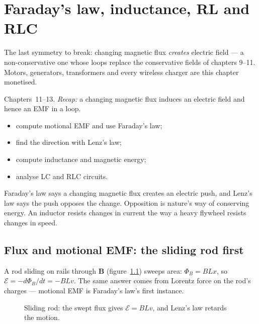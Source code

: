 \chapter{Faraday's law, inductance, RL and RLC}\label{ch:faraday}

The last symmetry to break: changing magnetic flux \emph{creates}
electric field --- a non-conservative one whose loops replace the
conservative fields of chapters 9--11. Motors, generators, transformers
and every wireless charger are this chapter monetised.

\begin{rulebox}
Chapters~11--13. \emph{Recap:} a changing magnetic flux induces an electric field and hence an EMF in a loop.
\end{rulebox}
\begin{wins}
\begin{itemize}
\item compute motional EMF and use Faraday's law;
\item find the direction with Lenz's law;
\item compute inductance and magnetic energy;
\item analyse LC and RLC circuits.
\end{itemize}
\end{wins}
\begin{principle}
Faraday's law says a changing magnetic flux creates an electric push, and Lenz's law says the push opposes the change. Opposition is nature's way of conserving energy. An inductor resists changes in current the way a heavy flywheel resists changes in speed.
\end{principle}

\section{Flux and motional EMF: the sliding rod first}\label{sec:far-rod}

A rod sliding on rails through $\mathbf B$ (figure~\ref{fig:rod}) sweeps
area: $\Phi_B=BLx$, so $\mathcal E=-d\Phi_B/dt=-BLv$. The same answer
comes from Lorentz force on the rod's charges --- motional EMF is
Faraday's law's first instance.

\begin{figure}[htbp]\centering

\caption{Sliding rod: the swept flux gives $\mathcal E=BLv$, and Lenz's
law retards the motion.}
\label{fig:rod}
\end{figure}


